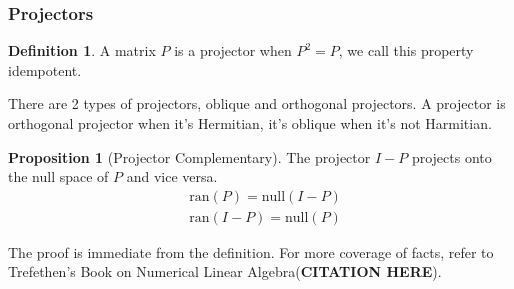 \documentclass[]{article}
\theoremstyle{definition}
\newtheorem{prop}{Proposition}[section]  %
\newtheorem{definition}{Definition}
\begin{document}
        \subsubsection{Projectors}
            \begin{definition}
                A matrix $P$ is a projector when $P^2 = P$, we call this property idempotent. 
            \end{definition}
            There are 2 types of projectors, oblique and orthogonal projectors. A projector is orthogonal projector when it's Hermitian, it's oblique when it's not Harmitian. 
            \begin{prop}[Projector Complementary]
                The projector $I - P$ projects onto the null space of $P$ and vice versa. 
                \begin{align}
                    & \text{ran}(P) = \text{null}(I - P)
                    \\
                    & \text{ran}(I - P) = \text{null}(P)
                \end{align}
            \end{prop}
            The proof is immediate from the definition. For more coverage of facts, refer to Trefethen's Book on Numerical Linear Algebra(\textbf{CITATION HERE}).
\end{document}
